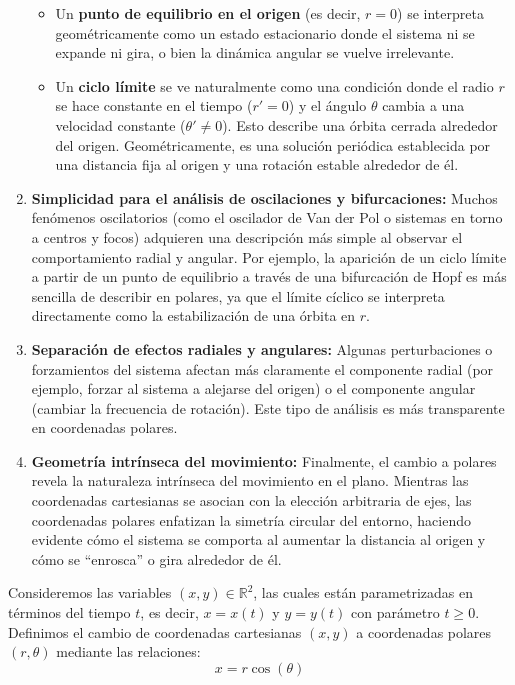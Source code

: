 \documentclass[12pt, a4paper]{report}
\begin{document}
\begin{enumerate}
	\begin{itemize}
		\item Un \textbf{punto de equilibrio en el origen} (es decir, $r=0$) se interpreta geométricamente como un estado estacionario donde el sistema ni se expande ni gira, o bien la dinámica angular se vuelve irrelevante.
		\item Un \textbf{ciclo límite} se ve naturalmente como una condición donde el radio $r$ se hace constante en el tiempo ($r'=0$) y el ángulo $\theta$ cambia a una velocidad constante ($\theta'\neq0$). Esto describe una órbita cerrada alrededor del origen. Geométricamente, es una solución periódica establecida por una distancia fija al origen y una rotación estable alrededor de él.
	\end{itemize}
	\item \textbf{Simplicidad para el análisis de oscilaciones y bifurcaciones:}
	Muchos fenómenos oscilatorios (como el oscilador de Van der Pol o sistemas en torno a centros y focos) adquieren una descripción más simple al observar el comportamiento radial y angular. Por ejemplo, la aparición de un ciclo límite a partir de un punto de equilibrio a través de una bifurcación de Hopf es más sencilla de describir en polares, ya que el límite cíclico se interpreta directamente como la estabilización de una órbita en $r$.
	\item \textbf{Separación de efectos radiales y angulares:}
	Algunas perturbaciones o forzamientos del sistema afectan más claramente el componente radial (por ejemplo, forzar al sistema a alejarse del origen) o el componente angular (cambiar la frecuencia de rotación). Este tipo de análisis es más transparente en coordenadas polares.
	\item \textbf{Geometría intrínseca del movimiento:}
	Finalmente, el cambio a polares revela la naturaleza intrínseca del movimiento en el plano. Mientras las coordenadas cartesianas se asocian con la elección arbitraria de ejes, las coordenadas polares enfatizan la simetría circular del entorno, haciendo evidente cómo el sistema se comporta al aumentar la distancia al origen y cómo se “enrosca” o gira alrededor de él.
\end{enumerate}

\newpage

Consideremos las variables $(x,y)\in\mathbb{R}^2$, las cuales están parametrizadas en términos del tiempo $t$, es decir, $x=x(t)$ y $y=y(t)$ con parámetro $t\geq0$. Definimos el cambio de coordenadas cartesianas $(x,y)$
a coordenadas polares $(r,\theta)$  mediante las relaciones:
\begin{equation}\label{eq:xpolar}
	x=r\cos(\theta)
\end{equation}
\end{document}
